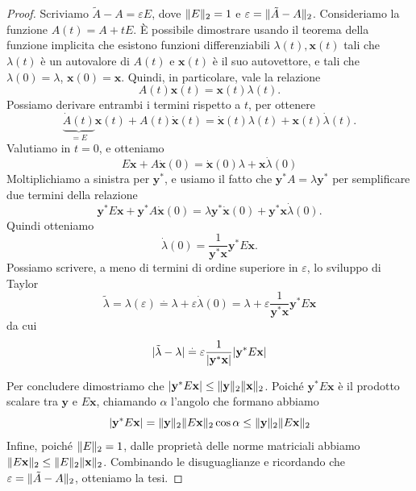 \documentclass[a4paper]{report}
\DeclarePairedDelimiter{\abs}{\lvert}{\rvert}
\DeclarePairedDelimiter{\norm}{\lVert}{\rVert}
\theoremstyle{definition}
\theoremstyle{remark}
\begin{document}
\begin{proof}
Scriviamo $\tilde{A} - A = \varepsilon E$, dove $\norm{E}_2 = 1$ e $\varepsilon = \norm{\tilde{A}-A}_2$. Consideriamo la funzione $A(t) = A + t E$. È possibile dimostrare usando il teorema della funzione implicita che esistono funzioni differenziabili $\lambda(t), \mathbf{x}(t)$ tali che $\lambda(t)$ è un autovalore di $A(t)$ e $\mathbf{x}(t)$ è il suo autovettore, e tali che $\lambda(0)=\lambda$, $\mathbf{x}(0) = \mathbf{x}$. Quindi, in particolare, vale la relazione
\[
A(t)\mathbf{x}(t) = \mathbf{x}(t) \lambda(t).
\]
Possiamo derivare entrambi i termini rispetto a $t$, per ottenere
\[
\underbrace{\dot{A}(t)}_{=E} \mathbf{x}(t) + A(t)\dot{\mathbf{x}}(t) = \dot{\mathbf{x}}(t) \lambda(t) + \mathbf{x}(t) \dot{\lambda}(t).
\]
Valutiamo in $t=0$, e otteniamo
\[
E \mathbf{x} + A \dot{\mathbf{x}}(0) = \dot{\mathbf{x}}(0) \lambda + \mathbf{x} \dot{\lambda}(0)
\]
Moltiplichiamo a sinistra per $\mathbf{y}^*$, e usiamo il fatto che $\mathbf{y}^* A = \lambda \mathbf{y}^*$ per semplificare due termini della relazione
\[
\mathbf{y}^* E \mathbf{x} +  \mathbf{y}^*A \dot{\mathbf{x}}(0) = \lambda\mathbf{y}^* \dot{\mathbf{x}}(0)  + \mathbf{y}^* \mathbf{x} \dot{\lambda}(0).
\]
Quindi otteniamo
\[
\dot{\lambda}(0) = \frac{1}{\mathbf{y}^*\mathbf{x}} \mathbf{y}^* E \mathbf{x}.
\]
Possiamo scrivere, a meno di termini di ordine superiore in $\varepsilon$, lo sviluppo di Taylor
\begin{equation} \label{eigperturb}
\tilde{\lambda} = \lambda(\varepsilon) \stackrel{.}{=} \lambda + \varepsilon \dot{\lambda}(0) = \lambda + \varepsilon \frac{1}{\mathbf{y}^*\mathbf{x}} \mathbf{y}^* E \mathbf{x}
\end{equation}
da cui
\[
\abs{\tilde{\lambda} - \lambda} \stackrel{.}{=} \varepsilon \frac{1}{\abs{\mathbf{y}^*\mathbf{x}}} \abs{\mathbf{y}^* E \mathbf{x}}
\]

Per concludere dimostriamo che $\abs{\mathbf{y}^* E \mathbf{x}} \leq \norm{\mathbf{y}}_2\norm{\mathbf{x}}_2$. Poiché $\mathbf{y}^* E \mathbf{x}$ è il prodotto scalare tra $\mathbf{y}$ e $E \mathbf{x}$, chiamando $\alpha$ l'angolo che formano abbiamo
\[
    \abs{\mathbf{y}^* E \mathbf{x}} = \norm{\mathbf{y}}_2 \norm{E \mathbf{x}}_2 \cos\alpha \leq \norm{\mathbf{y}}_2 \norm{E \mathbf{x}}_2
\]
Infine, poiché $\norm{E}_2 = 1$, dalle proprietà delle norme matriciali abbiamo $\norm{E\mathbf{x}}_2 \leq \norm{E}_2\norm{\mathbf{x}}_2$. Combinando le disuguaglianze e ricordando che $\varepsilon = \norm{\tilde{A}-A}_2$, otteniamo la tesi.
\end{proof}
\end{document}
